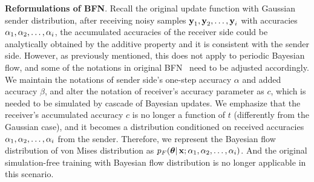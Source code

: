 \textbf{Reformulations of BFN}. Recall the original update function with Gaussian sender distribution, after receiving noisy samples $\operatorname{\mathbf{y}}_1,\operatorname{\mathbf{y}}_2,\dots,\operatorname{\mathbf{y}}_i$ with accuracies $\alpha_1,\alpha_2,\dots,\alpha_i$, the accumulated accuracies of the receiver side could be analytically obtained by the additive property and it is consistent with the sender side.
However, as previously mentioned, this does not apply to periodic Bayesian flow, and some of the notations in original BFN~\citep{bfn} need to be adjusted accordingly. We maintain the notations of sender side's one-step accuracy $\alpha$ and added accuracy $\beta$, and alter the notation of receiver's accuracy parameter as $c$, which is needed to be simulated by cascade of Bayesian updates. We emphasize that the receiver's accumulated accuracy $c$ is no longer a function of $t$ (differently from the Gaussian case), and it becomes a distribution conditioned on received accuracies $\alpha_1,\alpha_2,\dots,\alpha_i$ from the sender. Therefore, we represent the Bayesian flow distribution of von Mises distribution as $p_F(\bm{\theta}|\operatorname{\mathbf{x}};\alpha_1,\alpha_2,\dots,\alpha_i)$. And the original simulation-free training with Bayesian flow distribution is no longer applicable in this scenario.

